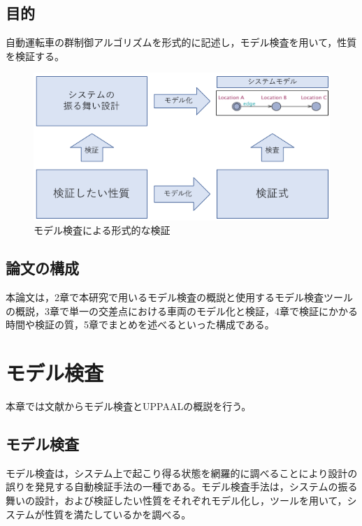 \documentclass{tpu-sotu}
\begin{document}
	\section{目的}
	自動運転車の群制御アルゴリズムを形式的に記述し，モデル検査を用いて，性質を検証する。
	\begin{figure}[htbp]
	\centering
	\includegraphics[width=130mm]{ModelVerification.png}
	\caption{モデル検査による形式的な検証}
	\label{ModelV}
	\end{figure}
	\section{論文の構成}
	本論文は，2章で本研究で用いるモデル検査の概説と使用するモデル検査ツールの概説，3章で単一の交差点における車両のモデル化と検証，4章で検証にかかる時間や検証の質，5章でまとめを述べるといった構成である。
\chapter{モデル検査}
本章では文献\cite{a1}からモデル検査とUPPAAL\cite{u1}の概説を行う。
	\section{モデル検査}
	モデル検査は，システム上で起こり得る状態を網羅的に調べることにより設計の誤りを発見する自動検証手法の一種である。モデル検査手法は，システムの振る舞いの設計，および検証したい性質をそれぞれモデル化し，ツールを用いて，システムが性質を満たしているかを調べる。
	
\end{document}
